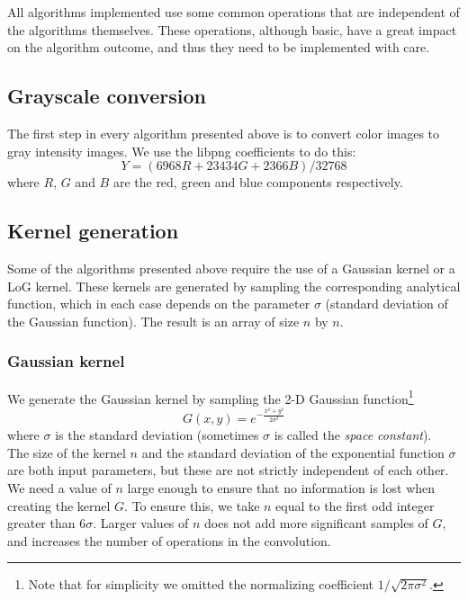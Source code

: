 \documentclass{ipol}
\numberwithin{equation}{section}
\numberwithin{table}{section}
\begin{document}
All algorithms implemented use some common operations that are independent of the algorithms themselves. 
These operations, although basic, have a great impact on the algorithm outcome, and thus they need to be 
implemented with care.\\

\subsection{Grayscale conversion}

The first step in every algorithm presented above is to convert color images to gray intensity images. 
We use the libpng coefficients to do this:
\begin{equation}
    Y = (6968 R + 23434 G + 2366 B) / 32768
\end{equation}
where $R$, $G$ and $B$ are the red, green and blue components respectively.\\

\subsection{Kernel generation}
\label{sec:appendix2}

Some of the algorithms presented above require the use of a Gaussian kernel or a LoG kernel. These 
kernels are generated by sampling the corresponding analytical function, which in each case depends 
on the parameter $\sigma$ (standard deviation of the Gaussian function). The result is an array of 
size $n$ by $n$.\\

\subsubsection{Gaussian kernel}

We generate the Gaussian kernel by sampling the 2-D Gaussian function\footnote{Note that for simplicity 
we omitted the normalizing coefficient $1/\sqrt{2\pi\sigma^2}$.}
\begin{equation}
	\label{eq:gaussian_function}
	G(x,y) = e^{-\frac{x^2+y^2}{2\sigma^2}}
\end{equation}
where $\sigma$ is the standard deviation (sometimes $\sigma$ is called the \textit{space constant}).\\

The size of the kernel $n$ and the standard deviation of the exponential function $\sigma$ are both 
input parameters, but these are not strictly independent of each other. We need a value 
of $n$ large enough to ensure that no information is lost when creating the kernel $G$. To ensure this, we take 
$n$ equal to the first odd integer greater than $6\sigma$. Larger values of $n$ does not add more 
significant samples ​​of $G$, and increases the number of operations in the convolution.\\
\end{document}
